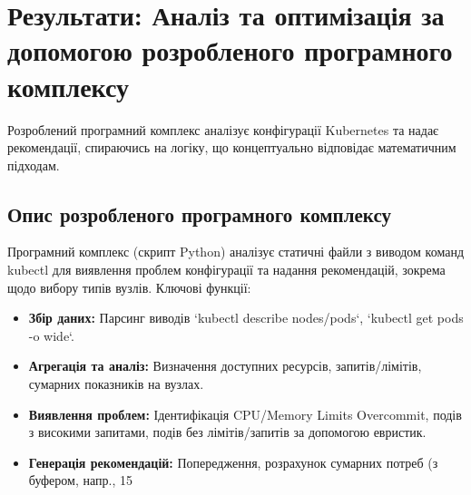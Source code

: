 \chapter{Результати: Аналіз та оптимізація за допомогою розробленого програмного комплексу}

Розроблений програмний комплекс аналізує конфігурації Kubernetes та надає рекомендації, спираючись на логіку, що концептуально відповідає математичним підходам.

\section{Опис розробленого програмного комплексу}
Програмний комплекс (скрипт Python) аналізує статичні файли з виводом команд kubectl для виявлення проблем конфігурації та надання рекомендацій, зокрема щодо вибору типів вузлів.
Ключові функції:
\begin{itemize}
	\item \textbf{Збір даних:} Парсинг виводів `kubectl describe nodes/pods`, `kubectl get pods -o wide`.
	\item \textbf{Агрегація та аналіз:} Визначення доступних ресурсів, запитів/лімітів, сумарних показників на вузлах.
	\item \textbf{Виявлення проблем:} Ідентифікація CPU/Memory Limits Overcommit, подів з високими запитами, подів без лімітів/запитів за допомогою евристик.
	\item \textbf{Генерація рекомендацій:} Попередження, розрахунок сумарних потреб (з буфером, напр., 15%
\end{itemize}

